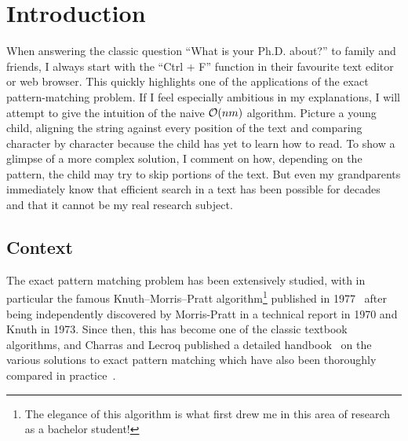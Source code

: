 \chapter*{Introduction}\label{chap:intro}\setcounter{page}{1}\frontmatter
{}

When answering the classic question ``What is your Ph.D. about?'' to family and friends, I always start with the ``Ctrl + F'' function in their favourite text editor or web browser. This quickly highlights one of the applications of the exact pattern-matching problem. If I feel especially ambitious in my explanations, I will attempt to give the intuition of the naive $\mathcal{O}(nm)$ algorithm. Picture a young child, aligning the string against every position of the text and comparing character by character because the child has yet to learn how to read. To show a glimpse of a more complex solution, I comment on how, depending on the pattern, the child may try to skip portions of the text. But even my grandparents immediately know that efficient search in a text has been possible for decades and that it cannot be my real research subject.

\section{Context}

The exact pattern matching problem has been extensively studied, with in particular the famous Knuth--Morris--Pratt algorithm\footnote{The elegance of this algorithm is what first drew me in this area of research as a bachelor student!} published in 1977~\cite{KMP} after being independently discovered by Morris-Pratt in a technical report in 1970 and Knuth in 1973. Since then, this has become one of the classic textbook algorithms, and Charras and Lecroq published a detailed handbook~\cite{Charras2004} on the various solutions to exact pattern matching which have also been thoroughly compared in practice~\cite{DBLP:journals/corr/abs-1012-2547, faro2013exact}.


